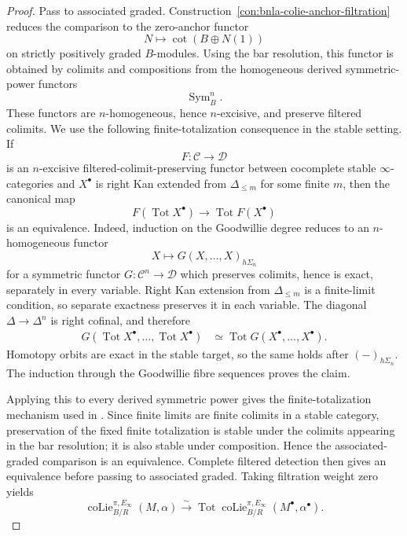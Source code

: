 \begin{proof}
Pass to associated graded.  Construction~\ref{con:bnla-colie-anchor-filtration}
reduces the comparison to the zero-anchor functor
\[
    N\longmapsto
    \operatorname{cot}(B\oplus N(1))
\]
on strictly positively graded $B$-modules.  Using the bar resolution, this
functor is obtained by colimits and compositions from the homogeneous derived
symmetric-power functors
\[
    \operatorname{Sym}^n_B.
\]
These functors are $n$-homogeneous, hence $n$-excisive, and preserve
filtered colimits.  We use the following finite-totalization consequence in
the stable setting.  If
\[
    F:\mathcal C\longrightarrow\mathcal D
\]
is an $n$-excisive filtered-colimit-preserving functor between cocomplete
stable $\infty$-categories and $X^\bullet$ is right Kan extended from
$\Delta_{\leq m}$ for some finite $m$, then the canonical map
\[
    F(\operatorname*{Tot}X^\bullet)
    \longrightarrow
    \operatorname*{Tot}F(X^\bullet)
\]
is an equivalence.  Indeed, induction on the Goodwillie degree reduces to an
$n$-homogeneous functor
\[
    X\longmapsto
    G(X,\ldots,X)_{h\Sigma_n}
\]
for a symmetric functor $G:\mathcal C^n\to\mathcal D$ which preserves
colimits, hence is exact, separately in every variable.  Right Kan extension
from $\Delta_{\leq m}$ is a finite-limit condition, so separate exactness
preserves it in each variable.  The diagonal
$\Delta\to\Delta^n$ is right cofinal, and therefore
\[
\begin{aligned}
G(\operatorname*{Tot}X^\bullet,\ldots,
  \operatorname*{Tot}X^\bullet)
&\simeq
\operatorname*{Tot}
G(X^\bullet,\ldots,X^\bullet).
\end{aligned}
\]
Homotopy orbits are exact in the stable target, so the same holds after
$(-)_{h\Sigma_n}$.  The induction through the Goodwillie fibre sequences
proves the claim.

Applying this to every derived symmetric power gives the finite-totalization
mechanism used in \cite{BrantnerMagidsonNuiten2025}.  Since finite limits are
finite colimits in a stable category, preservation of the fixed finite
totalization is stable under the colimits appearing in the bar resolution;
it is also stable under composition.  Hence the associated-graded comparison
is an equivalence.
Complete filtered detection then gives an equivalence before passing to
associated graded.  Taking filtration weight zero yields
\[
    \operatorname{coLie}^{\pi,E_\infty}_{B/R}(M,\alpha)
    \xrightarrow{\sim}
    \operatorname*{Tot}
    \operatorname{coLie}^{\pi,E_\infty}_{B/R}
    (M^\bullet,\alpha^\bullet).
\]


\end{proof}
